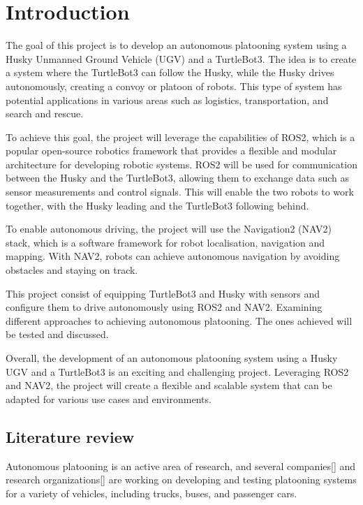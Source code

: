 \chapter{Introduction}

The goal of this project is to develop an autonomous platooning system using a Husky Unmanned Ground Vehicle (UGV) and a TurtleBot3. The idea is to create a system where the TurtleBot3 can follow the Husky, while the Husky drives autonomously, creating a convoy or platoon of robots. This type of system has potential applications in various areas such as logistics, transportation, and search and rescue. 

To achieve this goal, the project will leverage the capabilities of ROS2, which is a popular open-source robotics framework that provides a flexible and modular architecture for developing robotic systems. ROS2 will be used for communication between the Husky and the TurtleBot3, allowing them to exchange data such as sensor measurements and control signals. This will enable the two robots to work together, with the Husky leading and the TurtleBot3 following behind.

To enable autonomous driving, the project will use the Navigation2 (NAV2) stack, which is a software framework for robot localisation, navigation and mapping. With NAV2, robots can achieve autonomous navigation by avoiding obstacles and staying on track.

This project consist of equipping TurtleBot3 and Husky with sensors and configure them to drive autonomously using ROS2 and NAV2. Examining different approaches to achieving autonomous platooning. The ones achieved will be tested and discussed.  

Overall, the development of an autonomous platooning system using a Husky UGV and a TurtleBot3 is an exciting and challenging project. Leveraging ROS2 and NAV2, the project will create a flexible and scalable system that can be adapted for various use cases and environments.

\section{Literature review}
Autonomous platooning is an active area of research, and several companies[] and research organizations[] are working on developing and testing platooning systems for a variety of vehicles, including trucks, buses, and passenger cars.

